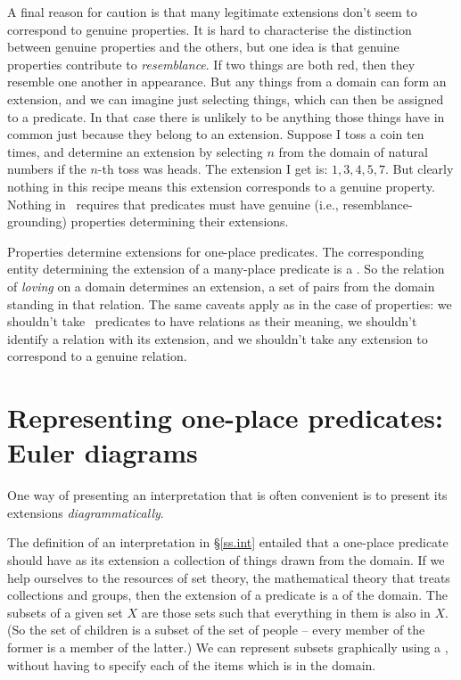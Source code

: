 A final reason for caution is that many legitimate extensions don't seem to correspond to genuine properties. It is hard to characterise the distinction between genuine properties and the others, but one idea is that genuine properties contribute to \emph{resemblance}. If two things are both red, then they resemble one another in appearance. But any things from a domain can form an extension, and we can imagine just selecting things, which can then be assigned to a predicate. In that case there is unlikely to be anything those things have in common just because they belong to an extension. Suppose I toss a coin ten times, and determine an extension by selecting $n$ from the domain of natural numbers if the $n$-th toss was heads. The extension I get is: $1, 3, 4, 5, 7$. But clearly nothing in this recipe means this extension corresponds to a genuine property. Nothing in \FOL\ requires that predicates must have genuine (i.e., resemblance-grounding) properties determining their extensions.  

Properties determine extensions for one-place predicates. The corresponding entity determining the extension of a many-place predicate is a . So the relation of \emph{loving} on a domain determines an extension, a set of pairs from the domain standing in that relation. The same caveats apply as in the case of properties: we shouldn't take \FOL\ predicates to have relations as their meaning, we shouldn't identify a relation with its extension, and we shouldn't take any extension to correspond to a genuine relation.

\section{Representing one-place predicates: Euler diagrams}\label{euler}

One way of presenting an interpretation that is often convenient is to present its extensions \emph{diagrammatically}.

The definition of an interpretation in §\ref{ss.int} entailed that a one-place predicate should have as its extension a collection of things drawn from the domain. If we help ourselves to the resources of set theory, the mathematical theory that treats collections and groups, then the extension of a predicate is a  of the domain. The subsets of a given set $X$ are those sets such that everything in them is also in $X$. (So the set of children is a subset of the set of people – every member of the former is a member of the latter.) We can represent subsets graphically using a , without having to specify each of the items which is in the domain.


